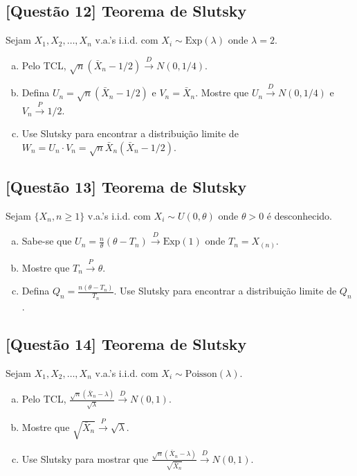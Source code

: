 \documentclass[12pt,a4paper]{article}
\begin{document}
\subsection*{[Questão 12] Teorema de Slutsky}

Sejam $X_1, X_2, \ldots, X_n$ v.a.'s i.i.d. com $X_i \sim \text{Exp}(\lambda)$ onde $\lambda = 2$.

\begin{enumerate}[(a)]
    \item Pelo TCL, $\sqrt{n}(\bar{X}_n - 1/2) \xrightarrow{D} N(0, 1/4)$.
    \item Defina $U_n = \sqrt{n}(\bar{X}_n - 1/2)$ e $V_n = \bar{X}_n$. Mostre que $U_n \xrightarrow{D} N(0, 1/4)$ e $V_n \xrightarrow{P} 1/2$.
    \item Use Slutsky para encontrar a distribuição limite de $W_n = U_n \cdot V_n = \sqrt{n}\bar{X}_n(\bar{X}_n - 1/2)$.
\end{enumerate}

\subsection*{[Questão 13] Teorema de Slutsky}

Sejam $\{X_n, n \geq 1\}$ v.a.'s i.i.d. com $X_i \sim U(0, \theta)$ onde $\theta > 0$ é desconhecido.

\begin{enumerate}[(a)]
    \item Sabe-se que $U_n = \frac{n}{\theta}(\theta - T_n) \xrightarrow{D} \text{Exp}(1)$ onde $T_n = X_{(n)}$.
    \item Mostre que $T_n \xrightarrow{P} \theta$.
    \item Defina $Q_n = \frac{n(\theta - T_n)}{T_n}$. Use Slutsky para encontrar a distribuição limite de $Q_n$.
\end{enumerate}

\subsection*{[Questão 14] Teorema de Slutsky}

Sejam $X_1, X_2, \ldots, X_n$ v.a.'s i.i.d. com $X_i \sim \text{Poisson}(\lambda)$.

\begin{enumerate}[(a)]
    \item Pelo TCL, $\frac{\sqrt{n}(\bar{X}_n - \lambda)}{\sqrt{\lambda}} \xrightarrow{D} N(0,1)$.
    \item Mostre que $\sqrt{\bar{X}_n} \xrightarrow{P} \sqrt{\lambda}$.
    \item Use Slutsky para mostrar que $\frac{\sqrt{n}(\bar{X}_n - \lambda)}{\sqrt{\bar{X}_n}} \xrightarrow{D} N(0,1)$.
\end{enumerate}
\end{document}
